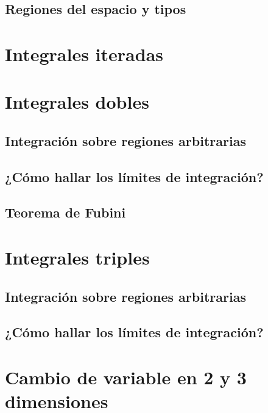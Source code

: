 \documentclass[12pt, fleqn]{report}                             %
\begin{document}
            \subsection{Regiones del espacio y tipos}
        
        \section{Integrales iteradas}
        
        \section{Integrales dobles}
            
            \subsection{Integración sobre regiones arbitrarias}
            
            \subsection{¿Cómo hallar los límites de integración?}
            
            \subsection{Teorema de Fubini}
        
        \section{Integrales triples}
            
            \subsection{Integración sobre regiones arbitrarias}
            
            \subsection{¿Cómo hallar los límites de integración?}
            
        \section{Cambio de variable en 2 y 3 dimensiones}
        
\end{document}
